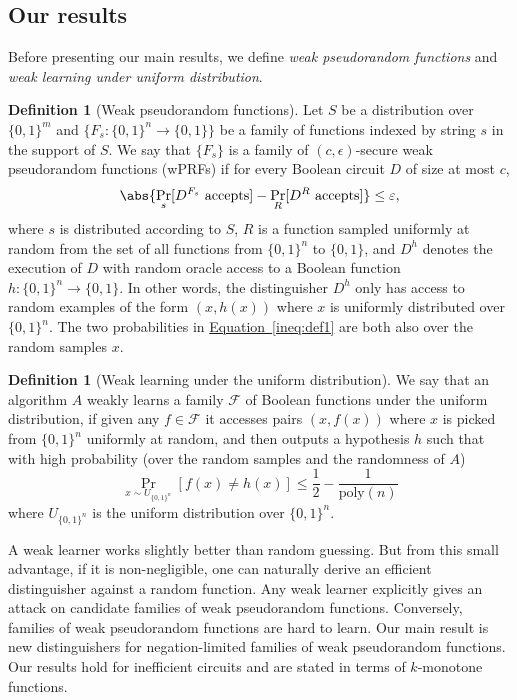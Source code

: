 \documentclass[11pt]{article}
\numberwithin{equation}{section}
\theoremstyle{definition}
\newtheorem{definition}[theorem]{Definition}
\theoremstyle{plain}
\newcommand{\expeqref}[2]{\hyperref[#2]{#1~\eqref{#2}}}
\newcommand{\poly}{\text{poly}}
\newcommand{\cF}{\mathcal{F}}
\newcommand{\warn}[1]{#1}
\begin{document}
\subsection{Our results}
Before presenting our main results, we define \emph{weak pseudorandom functions} and \emph{weak learning under uniform distribution}.
%
%
\begin{definition}[Weak pseudorandom functions]\label{def:wprfs}
Let $S$ be a distribution over $\{0,1\}^m$ and $\{F_s:\{0,1\}^n\rightarrow\{0,1\}\}$ be a family of functions indexed by string $s$ in the support of $S$. We say
that  %
$\{F_s\}$ is a
family of %
$(c,\epsilon)$-secure weak pseudorandom functions (wPRFs) if for every
%
%
%
Boolean circuit $D$  %
of size at most $c$,
\begin{align}\label{ineq:def1}
\abs{\Pr_s[D^{F_s}\mbox{ accepts}]-\Pr_R[D^R\mbox{ accepts}]}\leq \varepsilon,
\end{align}
where $s$ is distributed according to $S$, $R$ is a function sampled uniformly at random from the set of all functions from $\{0,1\}^n$ to $\{0,1\}$, and $D^h$ denotes the execution of $D$ with random oracle access to a Boolean function $h:\{0,1\}^n\rightarrow\{0,1\}$. In other words, the distinguisher $D^h$ only has access to random examples of the form $(x,h(x))$ where $x$ is uniformly distributed over $\{0,1\}^n$. \warn{The two probabilities in \expeqref{Equation}{ineq:def1} are both also over the
%
random samples $x$.}  %
\end{definition}

%
%
%
%
%
%
%
\begin{definition}[Weak learning under the uniform distribution] %
We say that an algorithm $A$ weakly learns a family
%
$\cF$ of Boolean functions %
under the uniform distribution, %
%
%
%
if given any $f\in \cF$ it accesses pairs $(x,f(x))$ where $x$ is picked from $\{0,1\}^n$ uniformly at random, and then %
%
%
%
%
%
outputs a hypothesis $h$ such that with high probability \warn{(over the random samples and the randomness of $A$)}
%
\begin{equation} %
 \Pr_{x \sim U_{\{0, 1\}^n}}\left[ f(x) \neq h(x) \right] \le \frac{1}{2}-\frac{1}{\poly(n)}   
%
\end{equation} %
where $U_{\{0,1\}^n}$ is the uniform distribution over $\{0,1\}^n$.
\end{definition}

A weak learner works slightly better than random guessing. But from this small
advantage, if %
it is  %
non-negligible,
one can naturally derive an efficient distinguisher against
a  %
random function.
Any weak learner explicitly gives an attack on  %
%
candidate families of weak pseudorandom functions.  %
Conversely,  %
families of %
%
%
weak pseudorandom functions are hard to learn.
Our main result is new distinguishers for negation-limited %
families of %
weak pseudorandom functions. Our results hold for inefficient circuits and are stated in terms of $k$-monotone functions.
\end{document}
